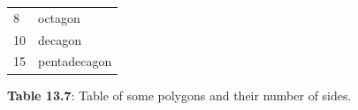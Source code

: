 \begin{table}[H]
{{\begin{center}
\begin{xtabular}[t]{|l|l|}
    
        8 &
    
    
        octagon%
     \tabularnewline{}
    
    
        10 &
    
    
        decagon%
     \tabularnewline{}
    
    
        15 &
    
    
        pentadecagon%
     \tabularnewline{}
    \end{xtabular}
      \end{center}
    \begin{center}{\small\bfseries Table 13.7}: Table of some polygons and their
number of sides.\end{center}
    
    \addtocounter{footnote}{-0}
    
          } %
        }{%
       
}
\end{table}
